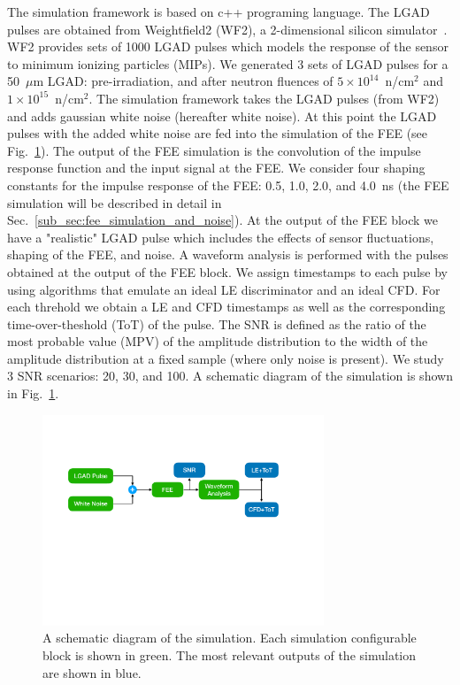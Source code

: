 \documentclass[preprint,1p]{elsarticle}
\begin{document}
The simulation framework is based on c++ programing language. The LGAD pulses are obtained
from Weightfield2 (WF2), a 2-dimensional silicon simulator~\cite{WF2}. WF2 provides sets of 1000 LGAD pulses which models the response
of the sensor to minimum ionizing particles (MIPs). We generated 3 sets of LGAD pulses for a 50~$\mu$m LGAD:
 pre-irradiation, and after neutron fluences of $5\times 10^{14}$~n/cm$^2$ and $1\times 10^{15}$~n/cm$^2$. The simulation framework
 takes the LGAD pulses (from WF2) and adds gaussian white noise (hereafter white noise). At this point the LGAD pulses with the added white noise
 are fed into the simulation of the FEE (see Fig.~\ref{fig:simulation_diagram}). The output of the FEE simulation is the convolution of the
 impulse response function and the input signal at the FEE. We consider four shaping constants for the impulse response
 of the FEE: 0.5, 1.0, 2.0, and 4.0~\si{ns} (the FEE simulation will be described in detail
 in Sec.~\ref{sub_sec:fee_simulation_and_noise}). At the output of the FEE block we have a "realistic" LGAD pulse which includes the effects
 of sensor fluctuations, shaping of the FEE, and noise. A waveform analysis is performed
  with the pulses obtained at the output of the FEE block. We assign timestamps to each pulse by using algorithms that emulate
  an ideal LE discriminator and an ideal CFD. For each threhold we obtain a LE and CFD
  timestamps as well as the corresponding time-over-theshold (ToT) of the pulse.
  The SNR is defined as the ratio of the most probable value (MPV) of the amplitude distribution to the
  width of the amplitude distribution at a fixed sample (where only noise is present). We study 3 SNR scenarios: 20, 30, and 100.
  A schematic diagram of the simulation is shown in Fig.~\ref{fig:simulation_diagram}.

\begin{figure}[htbp]
\centering
\includegraphics[width=0.75\textwidth]{figs/lgad_simulation_diagram.pdf}
\caption{A schematic diagram of the simulation. Each simulation configurable block is shown in green. The most relevant outputs
of the simulation are shown in blue.}
\label{fig:simulation_diagram}
\end{figure}
\end{document}

